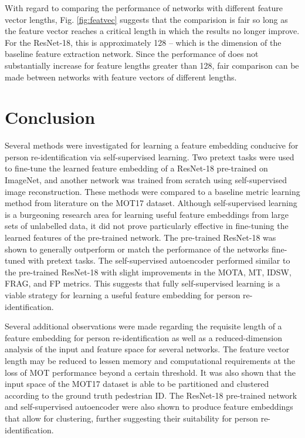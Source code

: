 \documentclass[10pt,twocolumn,letterpaper]{article}
\begin{document}
With regard to comparing the performance of networks with different feature vector lengths, Fig. \ref{fig:featvec} suggests that the comparision is fair so long as the feature vector reaches a critical length in which the results no longer improve. For the ResNet-18, this is approximately 128 -- which is the dimension of the baseline feature extraction network. Since the performance of does not substantially increase for feature lengths greater than 128, fair comparison can be made between networks with feature vectors of different lengths.

\section{Conclusion}
Several methods were investigated for learning a feature embedding conducive for person re-identification via self-supervised learning. Two pretext tasks were used to fine-tune the learned feature embedding of a ResNet-18 pre-trained on ImageNet, and another network was trained from scratch using self-supervised image reconstruction. These methods were compared to a baseline metric learning method from literature on the MOT17 dataset. Although self-supervised learning is a burgeoning research area for learning useful feature embeddings from large sets of unlabelled data, it did not prove particularly effective in fine-tuning the learned features of the pre-trained network. The pre-trained ResNet-18 was shown to generally outperform or match the performance of the networks fine-tuned with pretext tasks. The self-supervised autoencoder performed similar to the pre-trained ResNet-18 with slight improvements in the MOTA, MT, IDSW, FRAG, and FP metrics. This suggests that fully self-supervised learning is a viable strategy for learning a useful feature embedding for person re-identification. 

Several additional observations were made regarding the requisite length of a feature embedding for person re-identification as well as a reduced-dimension analysis of the input and feature space for several networks. The feature vector length may be reduced to lessen memory and computational requirements at the loss of MOT performance beyond a certain threshold. It was also shown that the input space of the MOT17 dataset is able to be partitioned and clustered according to the ground truth pedestrian ID. The ResNet-18 pre-trained network and self-supervised autoencoder were also shown to produce feature embeddings that allow for clustering, further suggesting their suitability for person re-identification.
\end{document}
